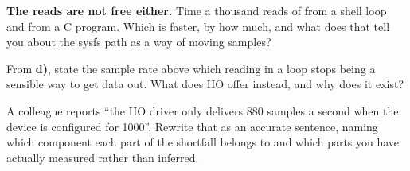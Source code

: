  \textbf{The reads are not free either.} Time a thousand reads of 
from a shell loop and from a C program. Which is faster, by how much, and what does that tell you
about the sysfs path as a way of moving samples?

 From \textbf{d)}, state the sample rate above which reading  in a
loop stops being a sensible way to get data out. What does IIO offer instead, and why does it exist?

 A colleague reports ``the IIO driver only delivers 880 samples a second when the device is
configured for 1000''. Rewrite that as an accurate sentence, naming which component each part of the
shortfall belongs to and which parts you have actually measured rather than inferred.
